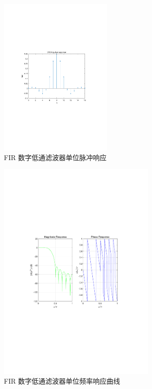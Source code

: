 \documentclass[12pt,AutoFakeBold]{article}
\begin{document}
\begin{figure}[htbp]
	\centering
	\includegraphics[width=0.5\textwidth]{figure/LP1.pdf}
	\caption{FIR 数字低通滤波器单位脉冲响应} \label{fig:LP1}
\end{figure}

\begin{figure}[htbp]
	\centering
	\includegraphics[width=0.7\textwidth]{figure/LP2.pdf}
	\caption{FIR 数字低通滤波器单位频率响应曲线} \label{fig:LP2}
\end{figure}
\end{document}

